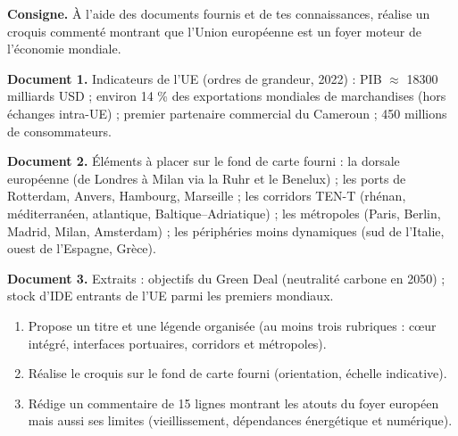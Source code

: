\documentclass[11pt]{article}
\newcounter{popsec}
\newcounter{popsub}
\newcommand{\courssub}[1]{%
  \stepcounter{popsub}%
  \par\vspace{9pt}\noindent{\popxbold\fontsize{11.5}{13}\selectfont\color{popink}{\color{poporange}\thepopsec.\thepopsub}\hspace{6pt}#1}\par\nopagebreak\vspace{4pt}
}
\begin{document}
\courssub{Je me prépare au Bac}

\begin{exercice}
\textbf{Consigne.} \og À l'aide des documents fournis et de tes connaissances, réalise un croquis commenté montrant que l'Union européenne est un foyer moteur de l'économie mondiale. \fg{}

\textbf{Document 1.} Indicateurs de l'UE (ordres de grandeur, 2022) : PIB $\approx$ \num{18300} milliards USD ; environ 14 \% des exportations mondiales de marchandises (hors échanges intra-UE) ; premier partenaire commercial du Cameroun ; 450 millions de consommateurs.

\textbf{Document 2.} Éléments à placer sur le fond de carte fourni : la \og dorsale \fg{} européenne (de Londres à Milan via la Ruhr et le Benelux) ; les ports de Rotterdam, Anvers, Hambourg, Marseille ; les corridors TEN-T (rhénan, méditerranéen, atlantique, Baltique--Adriatique) ; les métropoles (Paris, Berlin, Madrid, Milan, Amsterdam) ; les périphéries moins dynamiques (sud de l'Italie, ouest de l'Espagne, Grèce).

\textbf{Document 3.} Extraits : objectifs du Green Deal (neutralité carbone en 2050) ; stock d'IDE entrants de l'UE parmi les premiers mondiaux.

\begin{enumerate}
\item Propose un titre et une légende organisée (au moins trois rubriques : cœur intégré, interfaces portuaires, corridors et métropoles).
\item Réalise le croquis sur le fond de carte fourni (orientation, échelle indicative).
\item Rédige un commentaire de 15 lignes montrant les atouts du foyer européen mais aussi ses limites (vieillissement, dépendances énergétique et numérique).
\end{enumerate}
\end{exercice}
\end{document}

